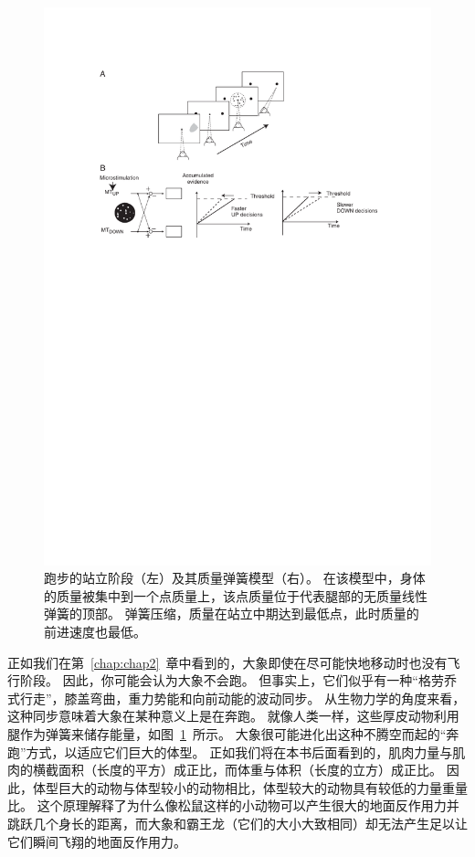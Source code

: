 \begin{figure}[!htb]
	\centering
	\includegraphics[width=1.0\linewidth]{chap3/3_5}
	\caption{跑步的站立阶段（左）及其质量弹簧模型（右）。
		在该模型中，身体的质量被集中到一个点质量上，该点质量位于代表腿部的无质量线性弹簧的顶部。
		弹簧压缩，质量在站立中期达到最低点，此时质量的前进速度也最低。 \label{fig:3_5}}
\end{figure}


正如我们在第~\ref{chap:chap2}~章中看到的，大象即使在尽可能快地移动时也没有飞行阶段。
因此，你可能会认为大象不会跑。
但事实上，它们似乎有一种“格劳乔式行走”，膝盖弯曲，重力势能和向前动能的波动同步。
从生物力学的角度来看，这种同步意味着大象在某种意义上是在奔跑。
就像人类一样，这些厚皮动物利用腿作为弹簧来储存能量，如图~\ref{fig:3_5}~所示。
大象很可能进化出这种不腾空而起的“奔跑”方式，以适应它们巨大的体型。
正如我们将在本书后面看到的，肌肉力量与肌肉的横截面积（长度的平方）成正比，而体重与体积（长度的立方）成正比。
因此，体型巨大的动物与体型较小的动物相比，体型较大的动物具有较低的力量重量比。
这个原理解释了为什么像松鼠这样的小动物可以产生很大的地面反作用力并跳跃几个身长的距离，而大象和霸王龙（它们的大小大致相同）却无法产生足以让它们瞬间飞翔的地面反作用力。



